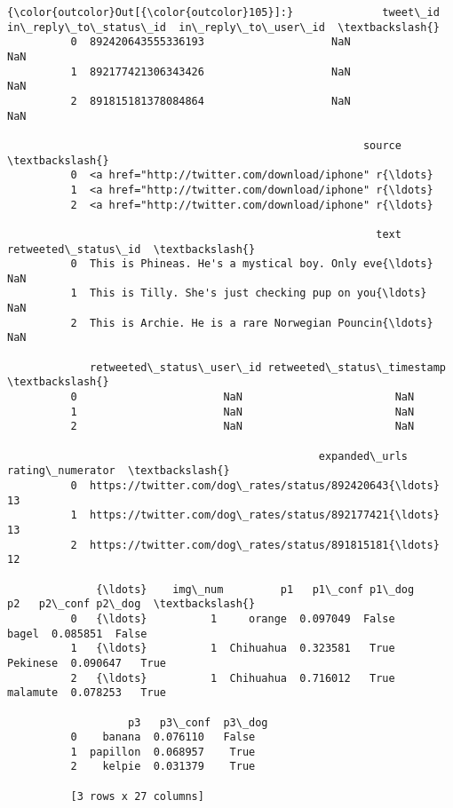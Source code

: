 \documentclass[11pt]{article}
\begin{document}
\begin{Verbatim}[commandchars=\\\{\}]
{\color{outcolor}Out[{\color{outcolor}105}]:}              tweet\_id  in\_reply\_to\_status\_id  in\_reply\_to\_user\_id  \textbackslash{}
          0  892420643555336193                    NaN                  NaN   
          1  892177421306343426                    NaN                  NaN   
          2  891815181378084864                    NaN                  NaN   
          
                                                        source  \textbackslash{}
          0  <a href="http://twitter.com/download/iphone" r{\ldots}   
          1  <a href="http://twitter.com/download/iphone" r{\ldots}   
          2  <a href="http://twitter.com/download/iphone" r{\ldots}   
          
                                                          text  retweeted\_status\_id  \textbackslash{}
          0  This is Phineas. He's a mystical boy. Only eve{\ldots}                  NaN   
          1  This is Tilly. She's just checking pup on you{\ldots}                  NaN   
          2  This is Archie. He is a rare Norwegian Pouncin{\ldots}                  NaN   
          
             retweeted\_status\_user\_id retweeted\_status\_timestamp  \textbackslash{}
          0                       NaN                        NaN   
          1                       NaN                        NaN   
          2                       NaN                        NaN   
          
                                                 expanded\_urls  rating\_numerator  \textbackslash{}
          0  https://twitter.com/dog\_rates/status/892420643{\ldots}                13   
          1  https://twitter.com/dog\_rates/status/892177421{\ldots}                13   
          2  https://twitter.com/dog\_rates/status/891815181{\ldots}                12   
          
              {\ldots}    img\_num         p1   p1\_conf p1\_dog        p2   p2\_conf p2\_dog  \textbackslash{}
          0   {\ldots}          1     orange  0.097049  False     bagel  0.085851  False   
          1   {\ldots}          1  Chihuahua  0.323581   True  Pekinese  0.090647   True   
          2   {\ldots}          1  Chihuahua  0.716012   True  malamute  0.078253   True   
          
                   p3   p3\_conf  p3\_dog  
          0    banana  0.076110   False  
          1  papillon  0.068957    True  
          2    kelpie  0.031379    True  
          
          [3 rows x 27 columns]
\end{Verbatim}
            

    
    
    
    
\end{document}
